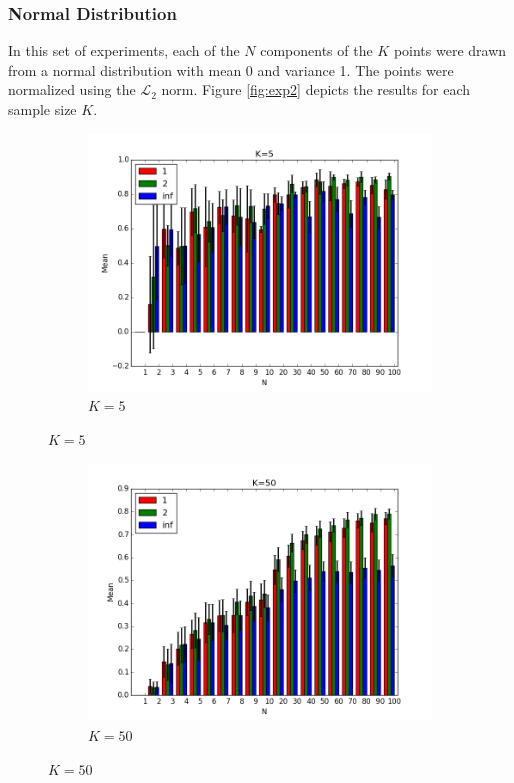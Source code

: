 \documentclass{article}
\begin{document}
\subsubsection{Normal Distribution}
In this set of experiments, each of the $N$ components of the $K$ points were drawn from a normal distribution with mean 0 and variance 1. The points were normalized using the $\mathcal{L}_2$ norm. Figure \ref{fig:exp2} depicts the results for each sample size $K$.
\begin{figure}[H]
    \centering
    \begin{subfigure}[h]{.8\textwidth}
        \includegraphics[width=\textwidth]{l-experiment2-5-inf.png}
        \caption{$K=5$}
        \label{fig:exp2k5}
    \end{subfigure}
\end{figure}
\begin{figure}[H]
\centering
   \ContinuedFloat
   \begin{subfigure}[h]{.8\textwidth}
        \includegraphics[width=\textwidth]{l-experiment2-50-inf.png}
        \caption{$K=50$}
        \label{fig:exp2k50}
    \end{subfigure}
   \centering
\end{figure}
\end{document}

